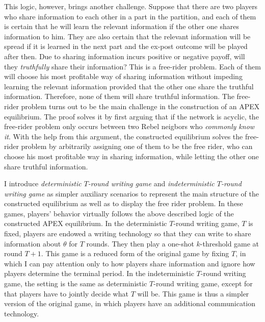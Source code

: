 \documentclass[12pt,letter]{article}
\theoremstyle{definition}
\theoremstyle{remark}
\theoremstyle{claim}
\begin{document}
This logic, however, brings another challenge. Suppose that there are two players who share information to each other in a part in the partition, and each of them is certain that he will learn the relevant information if the other one shares information to him. They are also certain that the relevant information will be spread if it is learned in the next part and the ex-post outcome will be played after then. Due to sharing information incurs positive or negative payoff, will they \textit{truthfully} share their information? This is a free-rider problem. Each of them will choose his most profitable way of sharing information without impeding learning the relevant information provided that the other one share the truthful information. Therefore, none of them will share truthful information. The free-rider problem turns out to be the main challenge in the construction of an APEX equilibrium. The proof solves it by first arguing that if the network is acyclic, the free-rider problem only occurs between two Rebel neigbors who \textit{commonly know it}. With the help from this argument, the constructed equilibrium solves the free-rider problem by arbitrarily assigning one of them to be the {free rider}, who can choose his most profitable way in sharing information, while letting the other one share truthful information. 

I introduce \textit{deterministic $T$-round writing game} and \textit{indeterministic $T$-round writing game} as simpler auxiliary scenarios to represent the main structure of the constructed equilibrium as well as to display the free rider problem. In these games, players' behavior virtually follows the above described logic of the constructed APEX equilibrium. In the deterministic $T$-round writing game, $T$ is fixed, players are endowed a writing technology so that they can write to share information about $\theta$ for $T$ rounds. They then play a one-shot $k$-threshold game at round $T+1$. This game is a reduced form of the original game by fixing $T$, in which I can pay attention only to how players share information and ignore how players determine the terminal period. In the indeterministic $T$-round writing game, the setting is the same as deterministic $T$-round writing game, except for that players have to jointly decide what $T$ will be. This game is thus a simpler version of the original game, in which players have an additional communication technology. 
\end{document}
